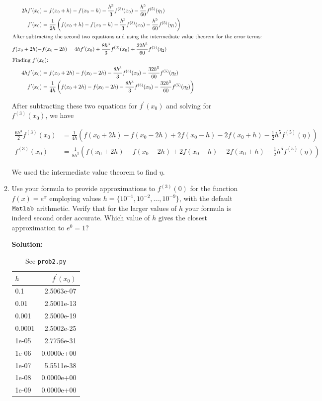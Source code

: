 \documentclass[12pt]{article}
\begin{document}
\begin{enumerate}
\begin{enumerate}
\begin{align*}
2hf^{\prime}(x_{0}) &= f(x_{0} + h) - f(x_{0} - h) - \frac{h^{3}}{3}f^{(3)}(x_{0}) - \frac{h^{5}}{60}f^{(5)}(\eta_{1})\\
f^{\prime}(x_{0}) &= \frac{1}{2h}\left( f(x_{0} + h) - f(x_{0} - h) - \frac{h^{3}}{3}f^{(3)}(x_{0}) - \frac{h^{5}}{60}f^{(5)}(\eta_{1})\right)\\
\intertext{After subtracting the second two equations and using the intermediate value theorem for the error terms:}
f(x_{0} + 2h) -& f(x_{0} - 2h) = 4hf^{\prime}(x_{0}) + \frac{8h^{3}}{3}f^{(3)}(x_{0}) + \frac{32h^{5}}{60}f^{(5)}(\eta_{2})\\
\intertext{Finding $f^{\prime}(x_{0})$:}
4hf^{\prime}(x_{0}) &= f(x_{0} + 2h) - f(x_{0} - 2h) - \frac{8h^{3}}{3}f^{(3)}(x_{0}) - \frac{32h^{5}}{60}f^{(5)}(\eta_{2})\\
f^{\prime}(x_{0}) &= \frac{1}{4h}\left( f(x_{0} + 2h) - f(x_{0} - 2h) - \frac{8h^{3}}{3}f^{(3)}(x_{0}) - \frac{32h^{5}}{60}f^{(5)}(\eta_{2})\right)
\end{align*}

After subtracting these two equations for $f^{\prime}(x_{0})$ and solving for $f^{(3)}(x_{0})$, we have

\begin{align*}
\frac{6h^{3}}{2}f^{(3)}(x_{0}) &= \frac{1}{4h}\left( f(x_{0} + 2h) - f(x_{0} - 2h) + 2f(x_{0} - h) - 2f(x_{0} + h) - \frac{1}{2}h^{5}f^{(5)}(\eta)\right)\\
f^{(3)}(x_{0}) &=\frac{1}{8h^{3}}\left( f(x_{0} + 2h) - f(x_{0} - 2h) + 2f(x_{0} - h) - 2f(x_{0} + h) - \frac{1}{2}h^{5}f^{(5)}(\eta)\right)
\end{align*}

We used the intermediate value theorem to find $\eta$. 

\item Use your formula to provide approximations to $f^{(3)}(0)$ for the function $f(x) = e^{x}$ employing values $h = \{ 10^{-1}, 10^{-2}, \ldots, 10^{-9}\}$, with the default ${\tt Matlab}$ arithmetic. Verify that for the larger values of $h$ your formula is indeed second order accurate. Which value of $h$ gives the closest approximation to $e^{0} = 1$?

{\bf Solution:}


\begin{table}[H]
\centering
\begin{tabular}{l r}
\hline \hline
$h$ & $f^{\prime}(x_{0})$\\
\hline
0.1 & 2.5063e-07\\
0.01 & 2.5001e-13\\
0.001 & 2.5000e-19\\
0.0001 & 2.5002e-25\\
1e-05 & 2.7756e-31\\
1e-06 & 0.0000e+00\\
1e-07 & 5.5511e-38\\
1e-08 & 0.0000e+00\\
1e-09 & 0.0000e+00\\
\hline
\end{tabular}
\caption{See {\tt prob2.py}}
\end{table}


\end{enumerate}
\end{enumerate}
\end{document}
